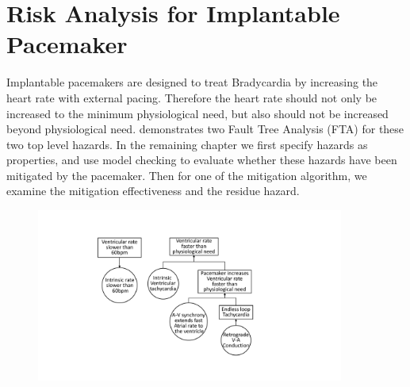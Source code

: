 %
%
\section{Risk Analysis for Implantable Pacemaker}
Implantable pacemakers are designed to treat Bradycardia by increasing the heart rate with external pacing. Therefore the heart rate should not only be increased to the minimum physiological need, but also should not be increased beyond physiological need.  demonstrates two Fault Tree Analysis (FTA) for these two top level hazards. In the remaining chapter we first specify hazards as properties, and use model checking to evaluate whether these hazards have been mitigated by the pacemaker. Then for one of the mitigation algorithm, we examine the mitigation effectiveness and the residue hazard.
\begin{figure}[!t]
		\centering
		\includegraphics[width=0.9\textwidth]{figs/risk_requirements.pdf}
		\caption{\small }
		\label{fig:risk_req}
\end{figure}

